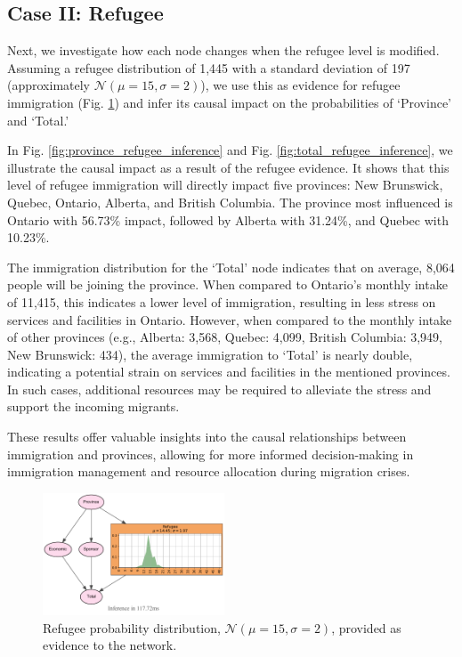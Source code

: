 \documentclass[conference]{IEEEtran}
\begin{document}
	\subsection{Case II: Refugee}
	Next, we investigate how each node changes when the refugee level is modified. Assuming a refugee distribution of 1,445 with a standard deviation of 197 (approximately $\mathcal{N}(\mu=15, \sigma=2)$), we use this as evidence for refugee immigration (Fig. \ref{fig:inferenceRefugee}) and infer its causal impact on the probabilities of `Province' and `Total.'
	
	In Fig. \ref{fig:province_refugee_inference} and Fig. \ref{fig:total_refugee_inference}, we illustrate the causal impact as a result of the refugee evidence. It shows that this level of refugee immigration will directly impact five provinces: New Brunswick, Quebec, Ontario, Alberta, and British Columbia. The province most influenced is Ontario with 56.73\% impact, followed by Alberta with 31.24\%, and Quebec with 10.23\%.
	
	The immigration distribution for the `Total' node indicates that on average, 8,064 people will be joining the province. When compared to Ontario's monthly intake of 11,415, this indicates a lower level of immigration, resulting in less stress on services and facilities in Ontario. However, when compared to the monthly intake of other provinces (e.g., Alberta: 3,568, Quebec: 4,099, British Columbia: 3,949, New Brunswick: 434), the average immigration to `Total' is nearly double, indicating a potential strain on services and facilities in the mentioned provinces. In such cases, additional resources may be required to alleviate the stress and support the incoming migrants.
	
	These results offer valuable insights into the causal relationships between immigration and provinces, allowing for more informed decision-making in immigration management and resource allocation during migration crises.
	
	\begin{figure}[!h]
		\begin{center}
			\includegraphics[clip, trim= 169 100 5 77,width=0.48\textwidth]{fig/inference_refugee.pdf}
			\caption{Refugee probability distribution, $\mathcal{N}(\mu=15,\sigma=2)$, provided as evidence to the network.
			}\label{fig:inferenceRefugee}
		\end{center}
	\end{figure}
	
\end{document}
